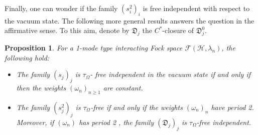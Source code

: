 \documentclass[12pt]{amsart}
\numberwithin{equation}{section}
\def\cf{{\mathcal F}}
\def\ch{{\mathcal H}}
\def\gd{{\mathfrak D}}
\def\l{\lambda} \def\L{\Lambda}
\def\t{\tau}
\def\om{\omega} \def\Om{\Omega}
\newtheorem{prop}[thm]{Proposition}
\theoremstyle{definition}
\begin{document}
Finally, one can wonder if the family $(s_i^2)_i$ is free independent with respect to the vacuum state.  The following more general results answers the question in the affirmative sense. To this aim, denote by $\gd_j$ the $C^*$-closure of $\gd^0_j$. 
\begin{prop}\label{2perfree}
For a 1-mode type interacting Fock space $\cf(\ch,\l_n)$, the following hold:
\begin{itemize}
\item[(i)] The family $(s_j)_j$ is $\t_\Om$- free independent in the vacuum state if and only if then the weights $(\omega_n)_{n\geq 1}$ are constant.
\item[(ii)]  The family $(s_j^2)_j$ is $\t_\Om$-free if and only if the weights $(\om_n)_n$ have period 2. Moreover, if $(\om_{n})$ has period 2 , the family $(\gd_j)_j$ is $\t_\Om$-free independent.
\end{itemize}
\end{prop}
\end{document}
